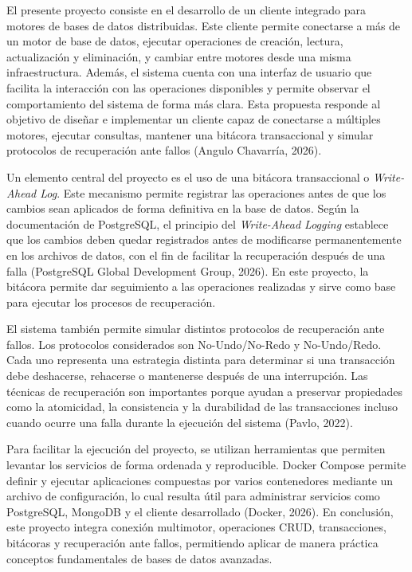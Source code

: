 \documentclass[12pt,letterpaper]{article}
\begin{document}
El presente proyecto consiste en el desarrollo de un cliente integrado para motores de bases de datos distribuidas. Este cliente permite conectarse a más de un motor de base de datos, ejecutar operaciones de creación, lectura, actualización y eliminación, y cambiar entre motores desde una misma infraestructura. Además, el sistema cuenta con una interfaz de usuario que facilita la interacción con las operaciones disponibles y permite observar el comportamiento del sistema de forma más clara. Esta propuesta responde al objetivo de diseñar e implementar un cliente capaz de conectarse a múltiples motores, ejecutar consultas, mantener una bitácora transaccional y simular protocolos de recuperación ante fallos (Angulo Chavarría, 2026).

Un elemento central del proyecto es el uso de una bitácora transaccional o \textit{Write-Ahead Log}. Este mecanismo permite registrar las operaciones antes de que los cambios sean aplicados de forma definitiva en la base de datos. Según la documentación de PostgreSQL, el principio del \textit{Write-Ahead Logging} establece que los cambios deben quedar registrados antes de modificarse permanentemente en los archivos de datos, con el fin de facilitar la recuperación después de una falla (PostgreSQL Global Development Group, 2026). En este proyecto, la bitácora permite dar seguimiento a las operaciones realizadas y sirve como base para ejecutar los procesos de recuperación.

El sistema también permite simular distintos protocolos de recuperación ante fallos. Los protocolos considerados son No-Undo/No-Redo y No-Undo/Redo. Cada uno representa una estrategia distinta para determinar si una transacción debe deshacerse, rehacerse o mantenerse después de una interrupción. Las técnicas de recuperación son importantes porque ayudan a preservar propiedades como la atomicidad, la consistencia y la durabilidad de las transacciones incluso cuando ocurre una falla durante la ejecución del sistema (Pavlo, 2022).

Para facilitar la ejecución del proyecto, se utilizan herramientas que permiten levantar los servicios de forma ordenada y reproducible. Docker Compose permite definir y ejecutar aplicaciones compuestas por varios contenedores mediante un archivo de configuración, lo cual resulta útil para administrar servicios como PostgreSQL, MongoDB y el cliente desarrollado (Docker, 2026). En conclusión, este proyecto integra conexión multimotor, operaciones CRUD, transacciones, bitácoras y recuperación ante fallos, permitiendo aplicar de manera práctica conceptos fundamentales de bases de datos avanzadas.
\end{document}

